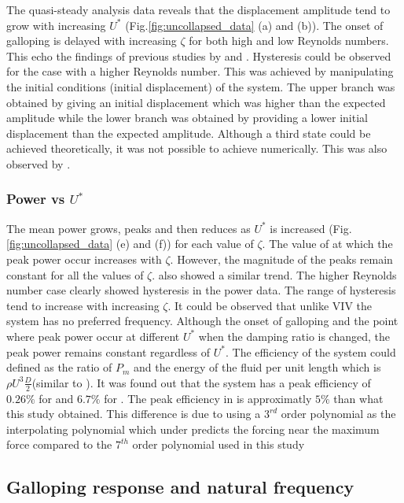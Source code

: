  The quasi-steady analysis data reveals that the displacement amplitude tend to grow with increasing $U^*$ (Fig.\ref{fig:uncollapsed_data} (a) and (b)). The onset of galloping is delayed with increasing $\zeta$ for both high and low Reynolds numbers. This echo the findings of previous studies by \cite{Parkinson1964} and \cite{Barrero-Gil2010a}. Hysteresis could be observed for the case with a higher Reynolds number. This was achieved by manipulating the initial conditions (initial displacement) of the system. The upper branch was obtained by giving an initial displacement which was higher than the expected amplitude while the lower branch was obtained by providing a lower initial displacement than the expected amplitude. Although a third state could be achieved theoretically, it was not possible to achieve numerically. This was also observed by \cite{Vio2007}.   

 
 \subsubsection*{Power vs $U^*$}
 
 The mean power grows, peaks and then reduces as $U^*$ is increased (Fig.\ref{fig:uncollapsed_data} (e) and (f)) for each value of $\zeta$. The value of  \ustar at which the peak power occur increases with $\zeta$. However, the magnitude of the peaks remain constant for all the values of $\zeta$.  \cite{Barrero-Gil2010a} also showed a similar trend. The higher Reynolds number case clearly showed hysteresis in the power data. The range of hysteresis tend to increase with increasing $\zeta$. It could be observed that unlike VIV the  system has no preferred frequency. Although the onset of galloping and the point where peak power occur at different $U^*$ when the damping ratio is changed, the peak power remains constant regardless of $U^*$. The efficiency of the system could defined as the ratio of $P_m$ and the energy of the fluid per unit length which is $\rho U^3\frac{D}{2}$(similar to \cite{Barrero-Gil2010a}). It was found out that the  system has a peak efficiency of  $0.26\%$  for  and $6.7\%$ for . The peak efficiency in \cite{Barrero-Gil2010a} is approximatly $5\%$ than what this study obtained. This difference is due to \cite{Barrero-Gil2010a} using a $3^{rd}$ order polynomial as the interpolating polynomial which under predicts the forcing near the maximum force compared to the $7^{th}$ order polynomial used in this study   
 
 \subsection{Galloping response and natural frequency}
 
